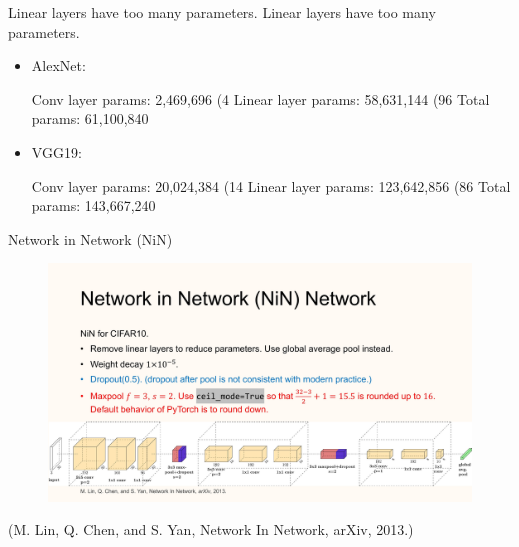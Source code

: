 \begin{frame}[allowframebreaks]

\begin{myconceptblock}{7.11}{Linear layers have too many parameters.}
    Linear layers have too many parameters.

    \begin{itemize}
        \item
        AlexNet:

        Conv layer params: 2,469,696 (4%
        Linear layer params: 58,631,144 (96%
        Total params: 61,100,840
        \item
        VGG19:

        Conv layer params: 20,024,384 (14%
        Linear layer params: 123,642,856 (86%
        Total params: 143,667,240
    \end{itemize}
\end{myconceptblock}

\end{frame}

\begin{frame}[allowframebreaks]

\begin{mydefinitionblock}{7.12}{Network in Network (NiN)}
    \begin{figure}[H]
        \centering
        \includegraphics[width=1.0\textwidth]{.././assets/7.10.jpg}
    \end{figure}

    (M. Lin, Q. Chen, and S. Yan, Network In Network, arXiv, 2013.)
\end{mydefinitionblock}

\end{frame}

